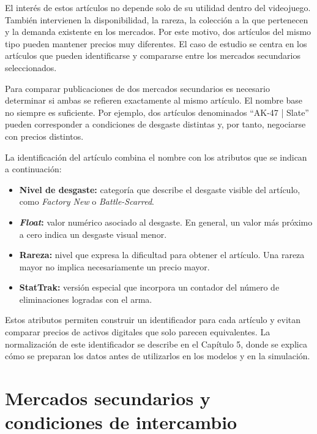 El interés de estos artículos no depende solo de su utilidad dentro del videojuego. También intervienen la disponibilidad, la rareza, la colección a la que pertenecen y la demanda existente en los mercados. Por este motivo, dos artículos del mismo tipo pueden mantener precios muy diferentes. El caso de estudio se centra en los artículos que pueden identificarse y compararse entre los mercados secundarios seleccionados.

Para comparar publicaciones de dos mercados secundarios es necesario determinar si ambas se refieren exactamente al mismo artículo. El nombre base no siempre es suficiente. Por ejemplo, dos artículos denominados \enquote{AK-47 | Slate} pueden corresponder a condiciones de desgaste distintas y, por tanto, negociarse con precios distintos.

La identificación del artículo combina el nombre con los atributos que se indican a continuación:
\begin{itemize}
    \item \textbf{Nivel de desgaste:} categoría que describe el desgaste visible del artículo, como \textit{Factory New} o \textit{Battle-Scarred}.
    \item \textbf{\textit{Float}:} valor numérico asociado al desgaste. En general, un valor más próximo a cero indica un desgaste visual menor.
    \item \textbf{Rareza:} nivel que expresa la dificultad para obtener el artículo. Una rareza mayor no implica necesariamente un precio mayor.
    \item \textbf{StatTrak:} versión especial que incorpora un contador del número de eliminaciones logradas con el arma.
\end{itemize}

Estos atributos permiten construir un identificador para cada artículo y evitan comparar precios de activos digitales que solo parecen equivalentes. La normalización de este identificador se describe en el Capítulo 5, donde se explica cómo se preparan los datos antes de utilizarlos en los modelos y en la simulación.

\section{Mercados secundarios y condiciones de intercambio}

